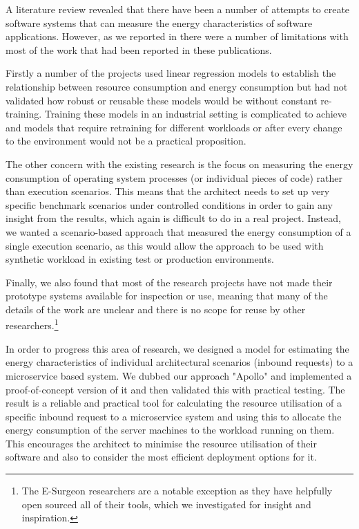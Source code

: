 A literature review revealed that there have been a number of attempts to create software systems that can measure the energy characteristics of software applications.  However, as we reported in  there were a number of limitations with most of the work that had been reported in these publications.  

Firstly a number of the projects used linear regression models to establish the relationship between resource consumption and energy consumption but had not validated how robust or reusable these models would be without constant re-training.  Training these models in an industrial setting is complicated to achieve and models that require retraining for different workloads or after every change to the environment would not be a practical proposition.  

The other concern with the existing research is the focus on measuring the energy consumption of operating system processes (or individual pieces of code) rather than execution scenarios.  This means that the architect needs to set up very specific benchmark scenarios under controlled conditions in order to gain any insight from the results, which again is difficult to do in a real project.  Instead, we wanted a scenario-based approach that measured the energy consumption of a single execution scenario, as this would allow the approach to be used with synthetic workload in existing test or production environments.  

Finally, we also found that most of the research projects have not made their prototype systems available for inspection or use, meaning that many of the details of the work are unclear and there is no scope for reuse by other researchers.\footnote{The E-Surgeon researchers \cite{noureddine2015-hotspots} are a notable exception as they have helpfully open sourced all of their tools, which we investigated for insight and inspiration.}

In order to progress this area of research, we designed a model for estimating the energy characteristics of individual architectural scenarios (inbound requests) to a microservice based system.  We dubbed our approach "Apollo" and implemented a proof-of-concept version of it and then validated this with practical testing.  The result is a reliable and practical tool for calculating the resource utilisation of a specific inbound request to a microservice system and using this to allocate the energy consumption of the server machines to the workload running on them. This encourages the architect to minimise the resource utilisation of their software and also to consider the most efficient deployment options for it.

